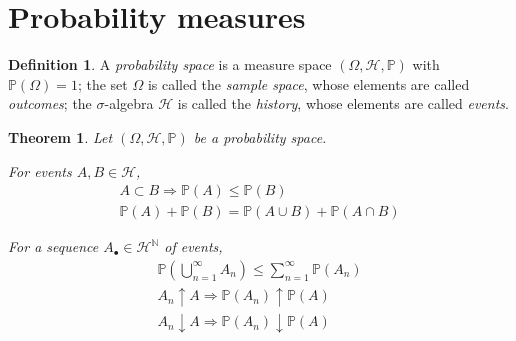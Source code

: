 \documentclass[11pt, a4paper, openany]{book}
\newtheorem{thm}{Theorem}\newtheorem{lem}{Lemma}\newtheorem{crl}{Corollary}
\theoremstyle{definition}
\newtheorem{define}{Definition}\newtheorem{exam}{Example}\newtheorem{remark}{Remark}
\newenvironment{tight_enumerate}{\begin{enumerate}\itemsep -0.2em}{\end{enumerate}}
\begin{document}
\section{Probability measures}
    \begin{define}
        A \textit{probability space} is a measure space $(\Omega,\mathscr{H},\mathbb{P})$ with $\mathbb{P}(\Omega)=1$; the set $\Omega$ is called the \textit{sample space}, whose elements are called \textit{outcomes}; the $\sigma$-algebra $\mathscr{H}$ is called the \textit{history}, whose elements are called \textit{events}.
    \end{define}
    \begin{thm}
        Let $(\Omega,\mathscr{H},\mathbb{P})$ be a probability space.
        \begin{tight_enumerate}
            \item For events $A,B\in \mathscr{H}$,
            \begin{gather*}
                A\subset B\Longrightarrow \mathbb{P}(A)\leqslant \mathbb{P}(B)\\
                \mathbb{P}(A)+\mathbb{P}(B)=\mathbb{P}(A\cup B)+\mathbb{P}(A\cap B)
            \end{gather*}
            \item For a sequence $A_\bullet\in\mathscr{H}^\mathbb{N}$ of events,
            \begin{gather*}
                \mathbb{P}\left(\bigcup_{n=1}^\infty A_n\right)\leqslant \sum_{n=1}^\infty \mathbb{P}(A_n)\\
                A_n\uparrow A\Longrightarrow \mathbb{P}(A_n)\uparrow \mathbb{P}(A)\\
                A_n\downarrow A\Longrightarrow \mathbb{P}(A_n)\downarrow \mathbb{P}(A)
            \end{gather*}
        \end{tight_enumerate}
    \end{thm}
\end{document}
